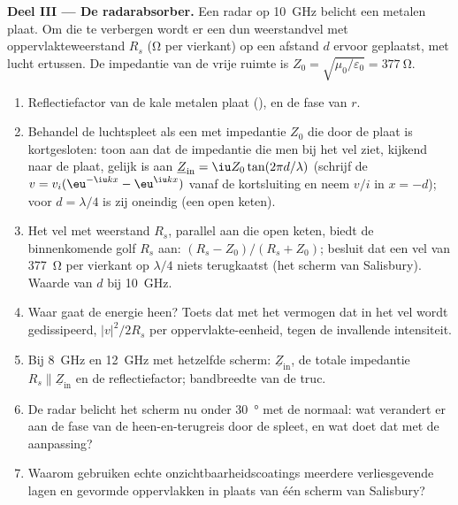 \begin{problem}
\medskip
\noindent\textbf{Deel III --- De radarabsorber.}
Een radar op \qty{10}{GHz} belicht een metalen plaat. Om die te verbergen
wordt er een dun weerstandvel met oppervlakteweerstand $R_s$ (\unit{\ohm}
per vierkant) op een afstand $d$ ervoor geplaatst, met lucht ertussen. De
impedantie van de vrije ruimte is
$Z_0 = \sqrt{\mu_0/\varepsilon_0} = \qty{377}{\ohm}$.
\begin{enumerate}[resume]
  \item Reflectiefactor van de kale metalen plaat (), en
        de fase van $r$.
  \item Behandel de luchtspleet als een  met impedantie $Z_0$
        die door de plaat is kortgesloten: toon aan dat de impedantie die
        men bij het vel ziet, kijkend naar de plaat, gelijk is aan
        $\underline Z_{\text{in}} = \iu Z_0
        \tan(2\pi d/\lambda)$ (schrijf
        de  $v = v_i(\eu^{-\iu kx} -
        \eu^{\iu kx})$ vanaf de
        kortsluiting en neem $v/i$ in $x = -d$); voor $d =
        \lambda/4$ is zij
        oneindig (een open keten).
  \item Het vel met weerstand $R_s$, parallel aan die open keten, biedt de
        binnenkomende golf $R_s$ aan: 
        $(R_s - Z_0)/(R_s + Z_0)$; besluit dat een vel van \qty{377}{\ohm}
        per vierkant op $\lambda/4$ niets terugkaatst (het scherm van
        Salisbury). Waarde van $d$ bij \qty{10}{GHz}.
  \item Waar gaat de energie heen? Toets dat met het vermogen dat in het vel
        wordt gedissipeerd, $|v|^2/2R_s$ per oppervlakte-eenheid, tegen de
        invallende intensiteit.
  \item Bij \qty{8}{GHz} en \qty{12}{GHz} met hetzelfde scherm:
        $\underline Z_{\text{in}}$, de totale impedantie
        $R_s \parallel \underline Z_{\text{in}}$ en de reflectiefactor;
        bandbreedte van de truc.
  \item De radar belicht het scherm nu onder \qty{30}{\degree} met de
        normaal: wat verandert er aan de fase van de heen-en-terugreis door
        de spleet, en wat doet dat met de aanpassing?
  \item Waarom gebruiken echte onzichtbaarheidscoatings meerdere
        verliesgevende lagen en gevormde oppervlakken in plaats van één
        scherm van Salisbury?
\end{enumerate}


\end{problem}
